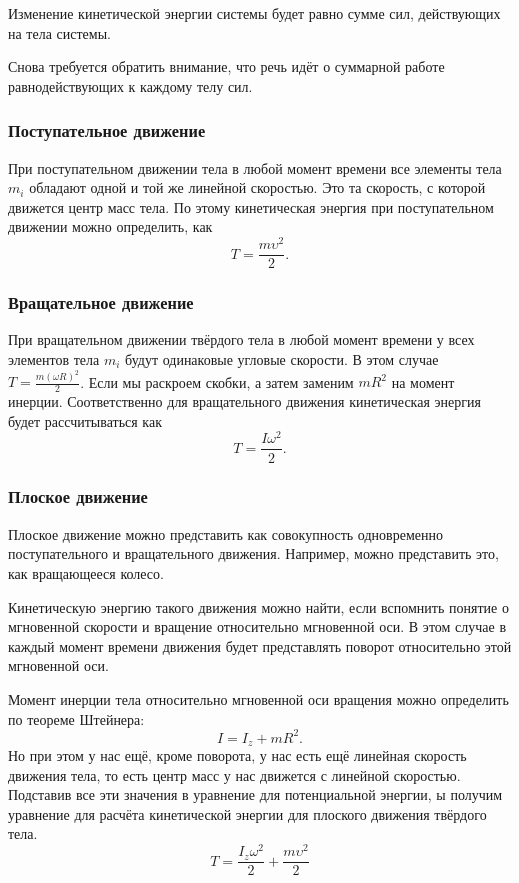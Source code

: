 \begin{theorem}%
  \label{thrm:kinetic-energy}
  Изменение кинетичес\-кой энергии системы будет равно сумме сил, действующих на
  тела системы.
\end{theorem}

Снова требуется обратить внимание, что речь идёт о суммарной работе
равнодействующих к каждому телу сил.

\subsubsection{Поступательное движение}
При поступательном движении тела в любой момент времени все элементы тела $m_i$
обладают одной и той же линейной скоростью. Это та скорость, с которой движется
центр масс тела. По этому кинетическая энергия при поступательном движении
можно определить, как \[
  T = \frac{m \upsilon^2}{2}
.\]

\subsubsection{Вращательное движение}
При вращательном движении твёрдого тела в любой момент времени у всех элементов
тела $m_i$ будут одинаковые угловые скорости. В этом случае \( T = \frac{m
(\omega R)^2}{2} \). Если мы раскроем скобки, а затем заменим \( m R^2 \) на
момент инерции. Соответственно для вращательного движения кинетическая энергия
будет рассчитываться как \[
  T = \frac{I \omega^2}{2}
.\]

\subsubsection{Плоское движение}

Плоское движение можно представить как совокупность одновременно
поступательного и вращательного движения. Например, можно представить это, как
вращающееся колесо.

Кинетическую энергию такого движения можно найти, если вспомнить понятие о
мгновенной скорости и вращение относительно мгновенной оси. В этом случае в
каждый момент времени движения будет представлять поворот относительно этой
мгновенной оси.

Момент инерции тела относительно мгновенной оси вращения можно определить по
теореме Штейнера: \[
  I = I_z + mR^2
.\] Но при этом у нас ещё, кроме поворота, у нас есть ещё линейная скорость
движения тела, то есть центр масс у нас движется с линейной скоростью. Подставив
все эти значения в уравнение для потенциальной энергии, ы получим уравнение для
расчёта кинетической энергии для плоского движения твёрдого тела.
\begin{equation}
  T = \frac{I_z \omega^2}{2} + \frac{m \upsilon^2}{2}
\end{equation}

